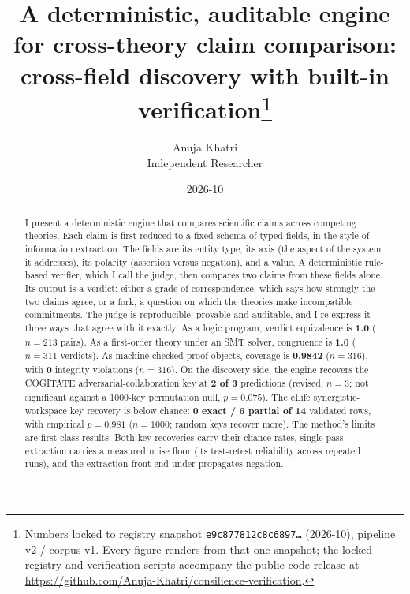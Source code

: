 \documentclass[11pt]{article}
\title{A deterministic, auditable engine for cross-theory claim comparison:\\
cross-field discovery with built-in verification\thanks{Numbers locked to registry snapshot
\texttt{e9c877812c8c6897\ldots} (2026-10), pipeline v2 / corpus v1. Every figure renders from that one
snapshot; the locked registry and verification scripts accompany the public code release at
\url{https://github.com/Anuja-Khatri/consilience-verification}.}}
\author{Anuja Khatri\\[2pt]\small Independent Researcher}
\date{2026-10}
\begin{document}
\maketitle

\begin{abstract}
I present a deterministic engine that compares scientific claims across competing theories. Each claim is
first reduced to a fixed schema of typed fields, in the style of information extraction. The fields are its
entity type, its axis (the aspect of the system it addresses), its polarity (assertion versus negation),
and a value. A deterministic rule-based verifier, which I call the judge, then compares two claims from
these fields
alone. Its output is a verdict: either a grade of correspondence, which says how strongly the two claims
agree, or a fork, a question on which the theories make incompatible commitments. The judge is
reproducible, provable and auditable, and I re-express it three ways that agree with it exactly. As a logic
program, verdict equivalence is \textbf{1.0} ($n = 213$ pairs). As a first-order theory under an SMT
solver, congruence is \textbf{1.0} ($n = 311$ verdicts). As machine-checked proof objects, coverage is
\textbf{0.9842} ($n = 316$), with \textbf{0} integrity violations ($n = 316$). On the discovery side, the
engine recovers the COGITATE adversarial-collaboration key at \textbf{2 of 3} predictions (revised;
$n = 3$; not significant against a 1000-key permutation null, $p = 0.075$). The eLife synergistic-workspace
key recovery is below chance: \textbf{0 exact / 6 partial of 14} validated rows, with empirical
$p = 0.981$ ($n = 1000$; random keys recover more). The method's limits are first-class results. Both key
recoveries carry their chance rates, single-pass extraction carries a measured noise floor (its test-retest
reliability across repeated runs), and the extraction front-end under-propagates negation.
\end{abstract}
\end{document}
